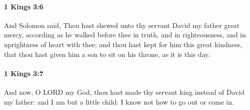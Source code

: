 		\paragraph{1 Kings 3:6} %
			\label{1KINGS-3-6}

			And Solomon said, Thou hast shewed unto thy servant David my father great mercy, according as he walked before thee in truth, and in righteousness, and in uprightness of heart with thee; and thou hast kept for him this great kindness, that thou hast given him a son to sit on his throne, as it is this day.


		\paragraph{1 Kings 3:7} %
			\label{1KINGS-3-7}

			And now, O LORD my God, thou hast made thy servant king instead of David my father: and I am but a little child: I know not how to go out or come in.

